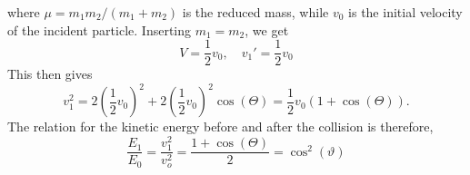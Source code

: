 \documentclass{article}
\begin{document}
where $\mu = m_1m_2 / (m_1 + m_2)$ is the reduced mass, while $v_0$ is the initial velocity of the incident particle. Inserting $m_1 = m_2$, we get
\begin{equation*}
    V = \frac{1}{2}v_0, \quad v_1' = \frac{1}{2}v_0
\end{equation*}
This then gives
\begin{equation*}
    v_1^2 = 2(\frac{1}{2}v_0)^2 + 2 (\frac{1}{2}v_0)^2 \cos(\Theta) = \frac{1}{2}v_0 (1 + \cos(\Theta)).
\end{equation*}
    The relation for the kinetic energy before and after the collision is therefore,
\begin{equation*}
    \frac{E_1}{E_0} = \frac{v_1^2}{v_o^2} = \frac{1 + \cos(\Theta)}{2} = \cos^2(\vartheta)
\end{equation*}
\end{document}
